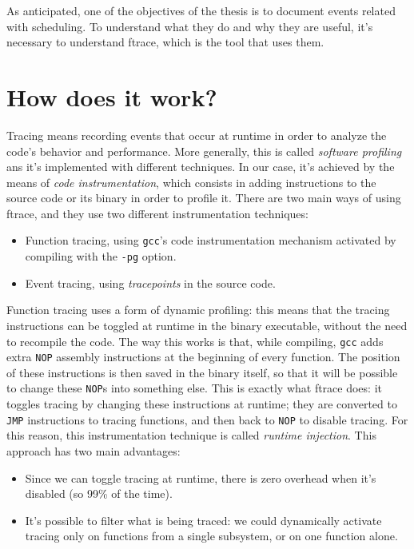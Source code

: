 \documentclass[10pt, oneside]{book}
\begin{document}
As anticipated, one of the objectives of the thesis is to document events related with scheduling. To understand what they do and why they are useful, it's necessary to understand ftrace, which is the tool that uses them.
\section{How does it work?}
\label{sec:how_does_it_work}

Tracing means recording events that occur at runtime in order to analyze the code's behavior and performance. More generally, this is called \textit{software profiling} ans it's implemented with different techniques. In our case, it's achieved by the means of \textit{code instrumentation}, which consists in adding instructions to the source code or its binary in order to profile it. There are two main ways of using ftrace, and they use two different instrumentation techniques:
\begin{itemize}
    \item Function tracing, using \verb|gcc|'s code instrumentation mechanism activated by compiling with the \verb|-pg| option.
    \item Event tracing, using \textit{tracepoints} in the source code.
\end{itemize}
Function tracing uses a form of dynamic profiling: this means that the tracing instructions can be toggled at runtime in the binary executable, without the need to recompile the code. The way this works is that, while compiling, \verb|gcc| adds extra \verb|NOP| assembly instructions at the beginning of every function. The position of these instructions is then saved in the binary itself, so that it will be possible to change these \verb|NOP|s into something else. This is exactly what ftrace does: it toggles tracing by changing these instructions at runtime; they are converted to \verb|JMP| instructions to tracing functions, and then back to \verb|NOP| to disable tracing. For this reason, this instrumentation technique is called \textit{runtime injection}. This approach has two main advantages: 
\begin{itemize}
    \item Since we can toggle tracing at runtime, there is zero overhead when it's disabled (so 99\% of the time).
    \item It's possible to filter what is being traced: we could dynamically activate tracing only on functions from a single subsystem, or on one function alone.
\end{itemize}
\end{document}
